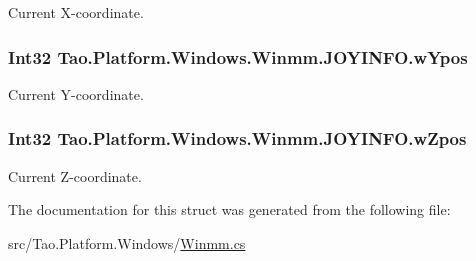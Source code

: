 Current X-\/coordinate. 

\hypertarget{struct_tao_1_1_platform_1_1_windows_1_1_winmm_1_1_j_o_y_i_n_f_o_aa8329072e16c2093f1c81a6ddb294c53}{
\subsubsection[{wYpos}]{\setlength{\rightskip}{0pt plus 5cm}Int32 {\bf Tao.Platform.Windows.Winmm.JOYINFO.wYpos}}}
\label{struct_tao_1_1_platform_1_1_windows_1_1_winmm_1_1_j_o_y_i_n_f_o_aa8329072e16c2093f1c81a6ddb294c53}


Current Y-\/coordinate. 

\hypertarget{struct_tao_1_1_platform_1_1_windows_1_1_winmm_1_1_j_o_y_i_n_f_o_aacfa79c6c641b06b806113ba42b54b11}{
\subsubsection[{wZpos}]{\setlength{\rightskip}{0pt plus 5cm}Int32 {\bf Tao.Platform.Windows.Winmm.JOYINFO.wZpos}}}
\label{struct_tao_1_1_platform_1_1_windows_1_1_winmm_1_1_j_o_y_i_n_f_o_aacfa79c6c641b06b806113ba42b54b11}


Current Z-\/coordinate. 



The documentation for this struct was generated from the following file:\begin{DoxyCompactItemize}
\item 
src/Tao.Platform.Windows/\hyperlink{_winmm_8cs}{Winmm.cs}\end{DoxyCompactItemize}

